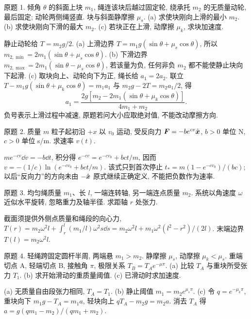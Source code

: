 \begin{exercise}
原题 1. 倾角 $\theta$ 的斜面上块 $m_1$, 绳连该块后越过固定轮, 绕承托 $m_2$ 的无质量动轮, 最后固定; 动轮两侧绳竖直. 块与斜面静摩擦 $\mu_s$. (a) 求使块刚向上滑的最小 $m_2$. (b) 求使块刚向下滑的最大 $m_2$. (c) 若块正在上滑, 动摩擦 $\mu_k$, 求块加速度.
\end{exercise}
\begin{solution}
静止动轮给 $T=m_2g/2$. (a) 上滑边界 $T=m_1g(\sin\theta+\mu_s\cos\theta)$, 所以 $m_{2,\min}=2m_1(\sin\theta+\mu_s\cos\theta)$. (b) 下滑边界 $m_{2,\max}=2m_1(\sin\theta-\mu_s\cos\theta)$, 若该量为负, 任何非负 $m_2$ 都不能使静止块向下起滑. (c) 取块向上、动轮向下为正, 绳长给 $a_1=2a_2$. 联立 $T-m_1g(\sin\theta+\mu_k\cos\theta)=m_1a_1$ 与 $m_2g-2T=m_2a_1/2$, 得
\begin{equation}
a_1=\frac{2g[m_2-2m_1(\sin\theta+\mu_k\cos\theta)]}{4m_1+m_2}.
\end{equation}
负号表示上滑过程中减速, 原题若问大小应取绝对值, 不能改动摩擦方向.
\end{solution}
\begin{exercise}
原题 2. 质量 $m$ 粒子起初沿 $+x$ 以 $v_0$ 运动, 受反向力 $\boldsymbol{F}=-be^{cv}\hat{\boldsymbol{x}}$, $b>0$ 单位 N, $c>0$ 单位 s/m. 求速率 $v(t)$.
\end{exercise}
\begin{solution}
$me^{-cv}\dd v=-b\dd t$, 积分得 $e^{-cv}=e^{-cv_0}+bc t/m$, 因而 $v=-(1/c)\ln(e^{-cv_0}+bc t/m)$. 该式只到首次停止 $t_*=m(1-e^{-cv_0})/(bc)$; 以后“反向力”的方向未由 $-\hat{\boldsymbol{x}}$ 原式继续正确定义, 不能把负数作为速率.
\end{solution}
\begin{exercise}
原题 3. 均匀绳质量 $m_1$、长 $l$, 一端连转轴, 另一端连点质量 $m_2$. 系统以角速度 $\omega$ 近似水平旋转, 忽略重力及轴半径. 求距轴 $r$ 处张力.
\end{exercise}
\begin{solution}
截面须提供外侧点质量和绳段的向心力, $T(r)=m_2\omega^2l+\int_r^l(m_1/l)\omega^2s\dd s=m_2\omega^2l+m_1\omega^2(l^2-r^2)/(2l)$. 末端边界 $T(l)=m_2\omega^2l$.
\end{solution}
\begin{exercise}
原题 4. 轻绳跨固定圆杆半周, 两端悬 $m_1>m_2$. 静摩擦 $\mu_s$, 动摩擦 $\mu_k<\mu_s$. 重端切点 A, 轻端切点 B, 接触角 $\pi$, 极限关系 $T_B=T_Ae^{-\mu\pi}$. (a) 比较 $T_A$ 与重块所受张力 $T_1$. (b) 求开始滑动的重质量阈值. (c) 已滑动时求加速度.
\end{exercise}
\begin{solution}
(a) 无质量自由段张力相同, $T_A=T_1$. (b) 静止阈值 $m_1=m_2e^{\mu_s\pi}$. (c) 令 $q=e^{-\mu_k\pi}$, 重块向下 $m_1g-T_A=m_1a$, 轻块向上 $qT_A-m_2g=m_2a$. 消去 $T_A$ 得 $a=g(qm_1-m_2)/(qm_1+m_2)$.
\end{solution}
